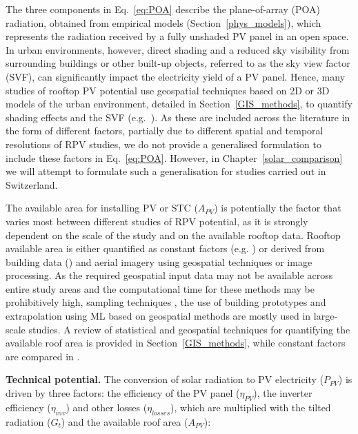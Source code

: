 The three components in Eq.~\ref{eq:POA} describe the plane-of-array (POA) radiation, obtained from empirical models (Section~\ref{phys_models}), which represents the radiation received by a fully unshaded PV panel in an open space. 
In urban environments, however, direct shading and a reduced sky visibility from surrounding buildings or other built-up objects, referred to as the sky view factor (SVF), can significantly impact the electricity yield of a PV panel. 
Hence, many studies of rooftop PV potential use geospatial techniques based on 2D or 3D models of the urban environment, detailed in Section~\ref{GIS_methods}, to quantify shading effects and the SVF (e.g.~\cite{desthieux_solar_2018,calcabrini_simplified_2019,wegertseder_combining_2016,jakubiec_method_2013}).
As these are included across the literature in the form of different factors, partially due to different spatial and temporal resolutions of RPV studies, we do not provide a generalised formulation to include these factors in Eq.~\ref{eq:POA}. However, in Chapter~\ref{solar_comparison} we will attempt to formulate such a generalisation for studies carried out in Switzerland.

The available area for installing PV or STC ($A_{PV}$) is potentially the factor that varies most between different studies of RPV potential, as it is strongly dependent on the scale of the study and on the available rooftop data. 
Rooftop available area is either quantified as constant factors (e.g. \cite{iea_potential_2002,wegertseder_combining_2016,portmann_sonnendach.ch:_2016}) or derived from building data (\cite{ramirez_camargo_spatio-temporal_2015,assouline_quantifying_2017,hong_development_2017}) and aerial imagery \cite{mainzer_assessment_2017} using geospatial techniques or image processing. 
As the required geospatial input data may not be available across entire study areas and the computational time for these methods may be prohibitively high, sampling techniques \cite{izquierdo_method_2008}, the use of building prototypes \cite{wegertseder_combining_2016} and extrapolation using ML \cite{assouline_quantifying_2017,assouline_large-scale_2018} based on geospatial methods are mostly used in large-scale studies. 
A review of statistical and geospatial techniques for quantifying the available roof area is provided in Section~\ref{GIS_methods}, while constant factors are compared in \cite{assouline_estimation_2017,wiginton_quantifying_2010,singh_estimation_2015}.

\textbf{Technical potential.} The conversion of solar radiation to PV electricity ($P_{PV}$) is driven by three factors: the efficiency of the PV panel ($\eta_{PV}$), the inverter efficiency ($\eta_\mathit{inv}$) and other losses ($\eta_\mathit{losses}$), which are multiplied with the tilted radiation ($G_t$) and the available roof area ($A_{PV}$):

